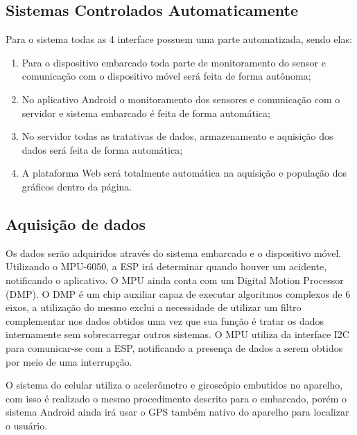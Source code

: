     



\subsection{\textbf{Sistemas Controlados Automaticamente}}
Para o sistema todas as 4 interface possuem uma parte automatizada, sendo elas:

\begin{enumerate}
    \item Para o dispositivo embarcado toda parte de monitoramento do sensor e comunicação com o dispositivo móvel será feita de forma autônoma;
    
    \item No aplicativo Android o monitoramento dos sensores e comunicação com o servidor e sistema embarcado é feita de forma automática;
    
    \item No servidor todas as tratativas de dados, armazenamento e aquisição dos dados será feita de forma automática;
    
    \item A plataforma Web será totalmente automática na aquisição e população dos gráficos dentro da página.
    
\end{enumerate}


\subsection{\textbf{Aquisição de dados}}



Os dados serão adquiridos através do sistema embarcado e o dispositivo móvel. Utilizando o MPU-6050, a ESP irá determinar quando houver um acidente, notificando o aplicativo. O MPU ainda conta com um Digital Motion Processor (DMP). O DMP é um chip auxiliar capaz de executar algoritmos complexos de 6 eixos, a utilização do mesmo exclui a necessidade de utilizar um filtro complementar nos dados obtidos uma vez que sua função é tratar os dados internamente sem sobrecarregar outros sistemas. O MPU utiliza da interface I2C para comunicar-se com a ESP, notificando a presença de dados a serem obtidos por meio de uma interrupção.



O sistema do celular utiliza o acelerômetro e giroscópio embutidos no aparelho, com isso é realizado o mesmo procedimento descrito para o embarcado, porém o sistema Android ainda irá usar o GPS também nativo do aparelho para localizar o usuário.




